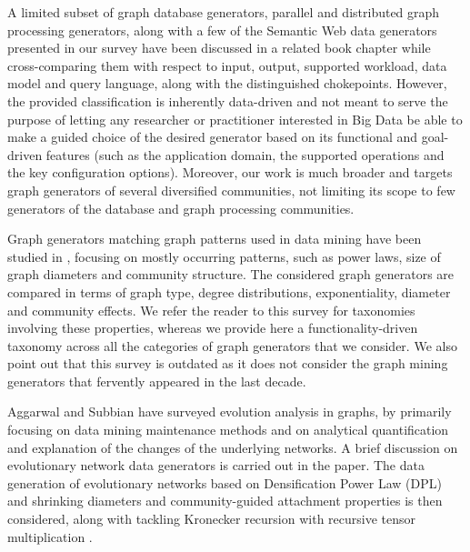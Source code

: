 A limited subset of graph database
generators, parallel and distributed graph processing generators, along
with a few of the Semantic Web data generators presented in our survey have
been discussed in a related book chapter
\cite{BFHI18} while cross-comparing them with respect to input, output,
supported workload, data model and query language, along with the
distinguished chokepoints. However, the provided classification is
inherently data-driven and not meant to serve the purpose of letting any
researcher or practitioner interested in Big Data be able to make a guided
choice of the desired
generator based on its functional and goal-driven features (such as the application domain,
the supported operations and the key configuration options).
Moreover, our work is much broader and targets graph generators of several
diversified communities, not limiting its scope to few generators of the database
and graph processing communities.

Graph generators matching graph patterns used in data mining have been
studied in \cite{Chakrabarti:2006:GML:1132952.1132954},
focusing on mostly occurring patterns, such as power laws, size of graph diameters
and community structure. The considered graph generators are compared in
terms of graph type, degree distributions, exponentiality, diameter and
community effects. We refer the reader to this survey for taxonomies
involving these properties, whereas we provide here a functionality-driven
taxonomy across all the categories of graph generators that we consider.
We also point out that this survey is outdated as it does not consider the
graph mining generators that fervently appeared in the last decade.


Aggarwal and Subbian \cite{AggarwalS14} have surveyed evolution analysis in
graphs, by primarily focusing on data mining maintenance methods and on analytical
quantification and explanation of the changes of the underlying networks.
A brief discussion on evolutionary
network data generators is carried out in
the paper. The data generation of evolutionary networks based on
Densification Power Law (DPL) and shrinking diameters \cite{LeskovecKF05} and community-guided
attachment properties \cite{LeskovecKF05} is then considered, along with tackling Kronecker
recursion with recursive tensor multiplication \cite{AkogluMF08}.




